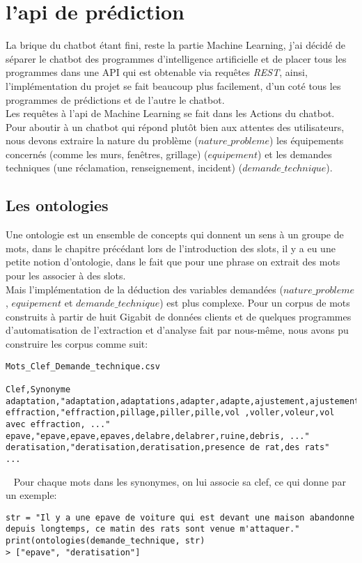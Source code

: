 \chapter{l'api de prédiction}
La brique du chatbot étant fini, reste la partie Machine Learning, j'ai décidé de séparer le chatbot des programmes d'intelligence artificielle et de placer tous les programmes dans une API qui est obtenable via requêtes \textit{REST}, ainsi, l'implémentation du projet se fait beaucoup plus facilement, d'un coté tous les programmes de prédictions et de l'autre le chatbot.\\
Les requêtes à l'api de Machine Learning se fait dans les Actions du chatbot.\\
\linebreak
Pour aboutir à un chatbot qui répond plutôt bien aux attentes des utilisateurs, nous devons extraire la nature du problème ($nature\_probleme$) les équipements concernés (comme les murs, fenêtres, grillage) ($equipement$) et les demandes techniques (une réclamation, renseignement, incident)  ($demande\_technique$).

\pagebreak
\section{Les ontologies}
Une ontologie est un ensemble de concepts qui donnent un sens à un groupe de mots, dans le chapitre précédant lors de l'introduction des slots, il y a eu une petite notion d'ontologie, dans le fait que pour une phrase on extrait des mots pour les associer à des slots.\\
Mais l'implémentation de la déduction des variables demandées ($nature\_probleme$, $equipement$ et $demande\_technique$) est plus complexe. Pour un corpus de mots construits à partir de huit Gigabit de données clients et de quelques programmes d'automatisation de l'extraction et d'analyse fait par nous-même, nous avons pu construire les corpus comme suit:
\ \linebreak
\begin{lstlisting}
Mots_Clef_Demande_technique.csv

Clef,Synonyme
adaptation,"adaptation,adaptations,adapter,adapte,ajustement,ajustements,ajuster,..."
effraction,"effraction,pillage,piller,pille,vol ,voller,voleur,vol avec effraction, ..."
epave,"epave,epave,epaves,delabre,delabrer,ruine,debris, ..."
deratisation,"deratisation,deratisation,presence de rat,des rats"
...
\end{lstlisting}
\ \linebreak
Pour chaque mots dans les synonymes, on lui associe sa clef, ce qui donne par un exemple:
\ \linebreak
\begin{lstlisting}
str = "Il y a une epave de voiture qui est devant une maison abandonne depuis longtemps, ce matin des rats sont venue m'attaquer."
print(ontologies(demande_technique, str)
> ["epave", "deratisation"]
\end{lstlisting}
\ \linebreak

